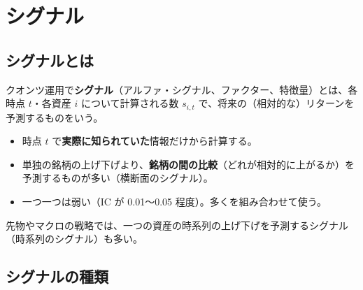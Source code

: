 \chapter{シグナル}
\label{ch:signal}

\section{シグナルとは}

クオンツ運用で\textbf{シグナル}（アルファ・シグナル、ファクター、特徴量）とは、各時点 $t$・各資産 $i$ について計算される数 $s_{i,t}$ で、将来の（相対的な）リターンを予測するものをいう。

\begin{itemize}
\item 時点 $t$ で\textbf{実際に知られていた}情報だけから計算する。
\item 単独の銘柄の上げ下げより、\textbf{銘柄の間の比較}（どれが相対的に上がるか）を予測するものが多い（横断面のシグナル）。
\item 一つ一つは弱い（IC が 0.01〜0.05 程度）。多くを組み合わせて使う。
\end{itemize}

先物やマクロの戦略では、一つの資産の時系列の上げ下げを予測するシグナル（時系列のシグナル）も多い。

\section{シグナルの種類}

